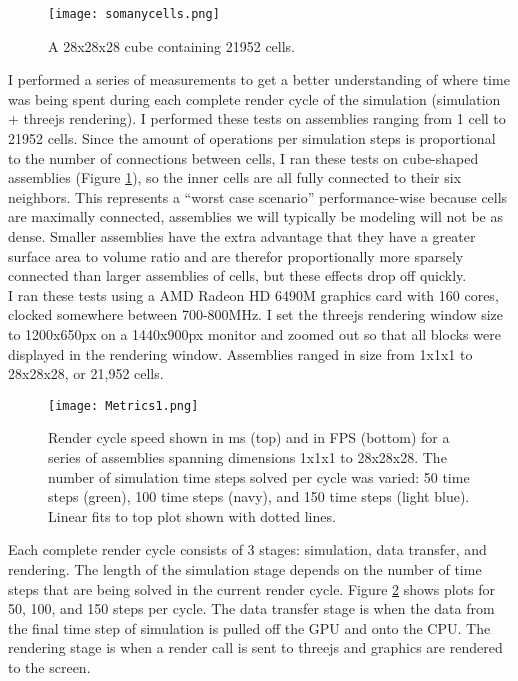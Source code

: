 {\begin{figure}
  \texttt{[image: somanycells.png]}
  \caption{A 28x28x28 cube containing 21952 cells.}
  \label{fig:somanycells}
\end{figure}

I performed a series of measurements to get a better understanding of where time was being spent during each complete render cycle of the simulation (simulation + threejs rendering).  I performed these tests on assemblies ranging from 1 cell to 21952 cells.  Since the amount of operations per simulation steps is proportional to the number of connections between cells, I ran these tests on cube-shaped assemblies (Figure \ref{fig:somanycells}), so the inner cells are all fully connected to their six neighbors.  This represents a ``worst case scenario'' performance-wise because cells are maximally connected, assemblies we will typically be modeling will not be as dense.  Smaller assemblies have the extra advantage that they have a greater surface area to volume ratio and are therefor proportionally more sparsely connected than larger assemblies of cells, but these effects drop off quickly.\\

I ran these tests using a AMD Radeon HD 6490M graphics card with 160 cores, clocked somewhere between 700-800MHz.  I set the threejs rendering window size to 1200x650px on a 1440x900px monitor and zoomed out so that all blocks were displayed in the rendering window.  Assemblies ranged in size from 1x1x1 to 28x28x28, or 21,952 cells.\\

\begin{figure}
  \texttt{[image: Metrics1.png]}
  \caption{Render cycle speed shown in ms (top) and in FPS (bottom) for a series of assemblies spanning dimensions 1x1x1 to 28x28x28.  The number of simulation time steps solved per cycle was varied: 50 time steps (green), 100 time steps (navy), and 150 time steps (light blue). Linear fits to top plot shown with dotted lines.}
  \label{fig:Metrics1}
\end{figure}

Each complete render cycle consists of 3 stages: simulation, data transfer, and rendering.  The length of the simulation stage depends on the number of time steps that are being solved in the current render cycle.  Figure \ref{fig:Metrics1} shows plots for 50, 100, and 150 steps per cycle.  The data transfer stage is when the data from the final time step of simulation is pulled off the GPU and onto the CPU.  The rendering stage is when a render call is sent to threejs and graphics are rendered to the screen.

}
